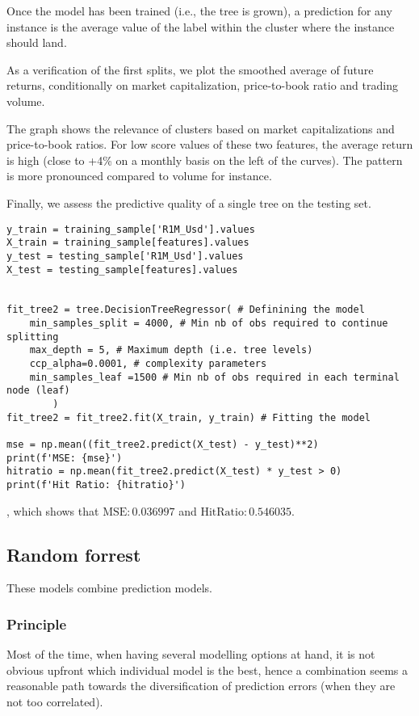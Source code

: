 Once the model has been trained (i.e., the tree is grown), a prediction for any instance is the average value of the label within the cluster where the instance should land.

As a verification of the first splits, we plot the smoothed average of future returns, conditionally on market capitalization, price-to-book ratio and trading volume.

The graph shows the relevance of clusters based on market capitalizations and price-to-book ratios. For low score values of these two features, the average return is high (close to +4\% on a monthly basis on the left of the curves). The pattern is more pronounced compared to volume for instance.

Finally, we assess the predictive quality of a single tree on the testing set.
\begin{lstlisting}
y_train = training_sample['R1M_Usd'].values
X_train = training_sample[features].values
y_test = testing_sample['R1M_Usd'].values
X_test = testing_sample[features].values


fit_tree2 = tree.DecisionTreeRegressor( # Definining the model
    min_samples_split = 4000, # Min nb of obs required to continue splitting
    max_depth = 5, # Maximum depth (i.e. tree levels)
    ccp_alpha=0.0001, # complexity parameters
    min_samples_leaf =1500 # Min nb of obs required in each terminal node (leaf)
        )
fit_tree2 = fit_tree2.fit(X_train, y_train) # Fitting the model

mse = np.mean((fit_tree2.predict(X_test) - y_test)**2)
print(f'MSE: {mse}')
hitratio = np.mean(fit_tree2.predict(X_test) * y_test > 0)
print(f'Hit Ratio: {hitratio}')
\end{lstlisting}
, which shows that  $\mathrm{MSE}: 0.036997$ and $\mathrm{Hit Ratio}: 0.546035$.

\subsection{Random forrest}
These models combine prediction models.

\subsubsection{Principle}
Most of the time, when having several modelling options at hand, it is not obvious upfront which individual model is the best, hence a combination seems a reasonable path towards the diversification of prediction errors (when they are not too correlated).

